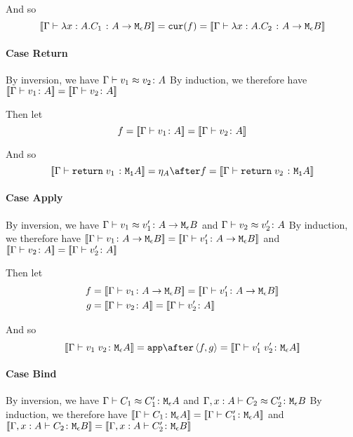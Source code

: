{    And so
    \begin{equation}
        {\bf [\![}\Gamma \vdash \lambda x : A. C_1\; \colon A \rightarrow \texttt{M}_{\epsilon}{B}{\bf ]\!]} = \texttt{cur}(f) = {\bf [\![}\Gamma \vdash \lambda x : A. C_2\; \colon A \rightarrow \texttt{M}_{\epsilon}{B}{\bf ]\!]}
    \end{equation}


\paragraph{Case Return}
By inversion, we have $\Gamma \vdash v_1 \approx v_2 \colon A$
By induction, we therefore have ${\bf [\![}\Gamma \vdash v_1 \colon A{\bf ]\!]} = {\bf [\![}\Gamma \vdash v_2 \colon A{\bf ]\!]}$

Then let
\begin{equation}
    f = {\bf [\![}\Gamma \vdash v_1 \colon A{\bf ]\!]} = {\bf [\![}\Gamma \vdash v_2 \colon A{\bf ]\!]}
\end{equation}

And so
\begin{equation}
    \deno{\gtyperelation{\return{v_1}}{\M{\1}{A}}} = \point{A}\after f = \deno{\gtyperelation{\return{v_2}}{\M{\1}{A}}}
\end{equation}


\paragraph{Case Apply}
By inversion, we have $\Gamma \vdash v_1 \approx v_1' \colon A \rightarrow \texttt{M}_{\epsilon}{B}$ and $\Gamma \vdash v_2 \approx v_2' \colon A$
By induction, we therefore have ${\bf [\![}\Gamma \vdash v_1 \colon A \rightarrow \texttt{M}_{\epsilon}{B}{\bf ]\!]}= {\bf [\![}\Gamma \vdash v_1' \colon A \rightarrow \texttt{M}_{\epsilon}{B}{\bf ]\!]}$ and ${\bf [\![}\Gamma \vdash v_2 \colon A{\bf ]\!]} = {\bf [\![}\Gamma \vdash v_2' \colon A{\bf ]\!]}$

Then let
\begin{align}
    f &{}= \deno{\gtyperelation{v_1}{\aeb}} = \deno{\gtyperelation{v_1'}{\aeb}}\\
    g &{}= \deno{\gtyperelation{v_2}{A}} = \deno{\gtyperelation{v_2'}{A}}
\end{align}



And so
\begin{equation}
    \deno{\gtyperelation{\apply{v_1}{v_2}}{\M{\e}{A}}} = \app\after\pr{f}{g} = \deno{\gtyperelation{\apply{v_1'}{v_2'}}{\M{\e}{A}}}
\end{equation}


\paragraph{Case Bind}
By inversion, we have $\Gamma \vdash C_1 \approx C_1' \colon \texttt{M}_{\epsilon}{A}$ and $\Gamma, x: A \vdash C_2 \approx C_2' \colon \texttt{M}_{\epsilon}{B}$
By induction, we therefore have ${\bf [\![}\Gamma \vdash C_1 \colon \texttt{M}_{\epsilon}{A}{\bf ]\!]}= {\bf [\![}\Gamma \vdash C_1' \colon \texttt{M}_{\epsilon}{A}{\bf ]\!]}$ and ${\bf [\![}\Gamma, x: A \vdash C_2 \colon \texttt{M}_{\epsilon}{B}{\bf ]\!]} = {\bf [\![}\Gamma, x: A \vdash C_2' \colon \texttt{M}_{\epsilon}{B}{\bf ]\!]}$

}

